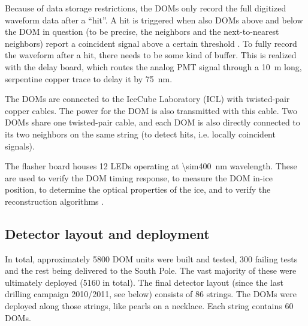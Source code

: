 \documentclass[
    a4paper, %
    fontsize=10pt, %
    twoside=true, %
    numbers=noenddot, %
    fontmethod=tex, %
]{kaobook}
\begin{document}
Because of data storage restrictions, the DOMs only record the full digitized waveform data after a ``hit''. A hit is triggered when also DOMs above and below the DOM in question (to be precise, the neighbors and the next-to-nearest neighbors) report a coincident signal above a certain threshold \cite{Aartsen2017}. To fully record the waveform after a hit, there needs to be some kind of buffer. This is realized with the delay board, which routes the analog PMT signal through a \SI{10}{\m} long, serpentine copper trace to delay it by \SI{75}{\nm}.

The DOMs are connected to the IceCube Laboratory (ICL) with twisted-pair copper cables. The power for the DOM is also transmitted with this cable. Two DOMs share one twisted-pair cable, and each DOM is also directly connected to its two neighbors on the same string (to detect hits, i.e. locally coincident signals).

The flasher board houses 12 LEDs operating at \SI{\sim400}{\nm} wavelength. These are used to verify the DOM timing response, to measure the DOM in-ice position, to determine the optical properties of the ice, and to verify the reconstruction algorithms \cite{Aartsen2017}.

\subsection*{Detector layout and deployment}
In total, approximately 5800 DOM units were built and tested, 300 failing tests and the rest being delivered to the South Pole. The vast majority of these were ultimately deployed (5160 in total). The final detector layout (since the last drilling campaign 2010/2011, see below) consists of 86 strings. The DOMs were deployed along those strings, like pearls on a necklace. Each string contains 60 DOMs.
\end{document}
